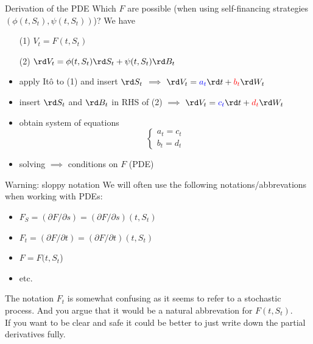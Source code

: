 \documentclass[pdf, handout]{beamer}
\begin{document}
\begin{frame}{Derivation of the PDE}
Which $F$ are possible (when using self-financing strategies $(\phi(t,S_t),\psi(t,S_t))$)?
We have
\begin{itemize}
\item[(1)] $V_t=F(t,S_t)$
\item[(2)] $\rd V_t= \phi(t,S_t) \rd S_t + \psi(t,S_t) \rd B_t$
\end{itemize}
\vspace{-.2cm}
\begin{itemize}
\item apply It\^{o} to (1) and insert $\rd S_t$  $\implies$
$
\rd V_t=\textcolor{blue}{a_t} \rd t + \textcolor{red}{b_t} \rd W_t
$
\item insert $\rd S_t$ and $\rd B_t$ in RHS of (2) $\implies$
$\rd V_t=\textcolor{blue}{c_t} \rd t + \textcolor{red}{d_t} \rd W_t$
\item obtain system of equations
\[
\left\{
  \begin{array}{ll}
    a_t=c_t  \\
    b_t=d_t %
  \end{array}
\right.
\]
\item solving $\implies$ conditions on $F$ (PDE)
\end{itemize}
\end{frame}

\begin{frame}{Warning: sloppy notation}
We will often use the following notations/abbrevations when working with PDEs:
\begin{itemize}
\item $F_S = (\partial F / \partial s) = (\partial F / \partial s)(t,S_t)$
\item $F_t = (\partial F / \partial t) = (\partial F / \partial t)(t,S_t)$
\item $F = F(t,S_t$)
\item etc.
\end{itemize}
The notation $F_t$ is somewhat confusing as it seems to refer to a stochastic process. And you argue that it would be a natural abbrevation for $F(t,S_t)$. \\
If you want to be clear and safe it could be better to just write down the partial derivatives fully.
\end{frame}
\end{document}
